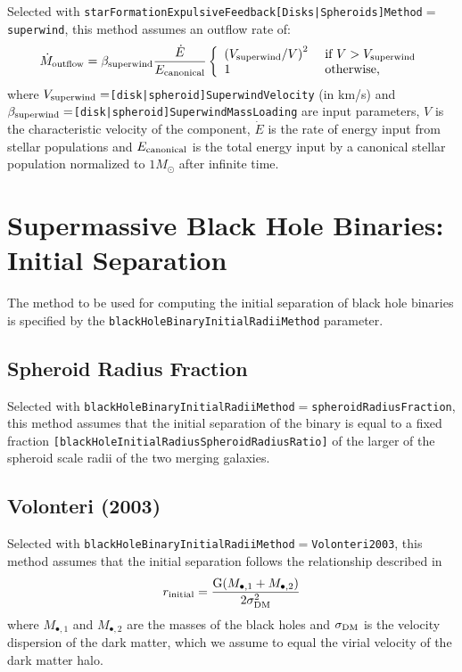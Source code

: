 Selected with {\tt starFormationExpulsiveFeedback[Disks|Spheroids]Method}$=${\tt superwind}, this method assumes an outflow rate of:
\begin{equation}
 \dot{M}_{\rm outflow} =  \beta_{\rm superwind} {\dot{E} \over E_{\rm canonical}} \left\{ \begin{array}{ll} \left( V_{\rm superwind}/V\right)^2 & \hbox{ if } V > V_{\rm superwind} \\ 1 & \hbox{ otherwise,} \end{array} \right.
\end{equation}
where $V_{\rm superwind}=${\tt [disk|spheroid]SuperwindVelocity} (in km/s) and $\beta_{\rm superwind}=${\tt [disk|spheroid]SuperwindMassLoading} are input parameters, $V$ is the characteristic velocity of the component, $\dot{E}$ is the rate of energy input from stellar populations and $E_{\rm canonical}$ is the total energy input by a canonical stellar population normalized to $1 M_\odot$ after infinite time.

\section{Supermassive Black Hole Binaries: Initial Separation}\label{sec:blackHoleBinaryInitialRadii}

The method to be used for computing the initial separation of black hole binaries is specified by the {\tt blackHoleBinaryInitialRadiiMethod} parameter.

\subsection{Spheroid Radius Fraction}

Selected with {\tt blackHoleBinaryInitialRadiiMethod}$=${\tt spheroidRadiusFraction}, this method assumes that the initial separation of the binary is equal to a fixed fraction {\tt [blackHoleInitialRadiusSpheroidRadiusRatio]} of the larger of the spheroid scale radii of the two merging galaxies.

\subsection{Volonteri (2003)}

Selected with {\tt blackHoleBinaryInitialRadiiMethod}$=${\tt Volonteri2003}, this method assumes that the initial separation follows the relationship described in \cite{volonteri_assembly_2003} 
\begin{equation}
 r_{\rm initial} = { {\rm G} (M_{\bullet,1} + M_{\bullet, 2}) \over 2
\sigma_{\rm DM}^2 }
\end{equation}
where $M_{\bullet, 1}$ and $M_{\bullet, 2}$ are the masses of the black holes
and $\sigma_{\rm DM}$ is the velocity dispersion of the dark matter, which we
assume to equal the virial velocity of the dark matter halo.

